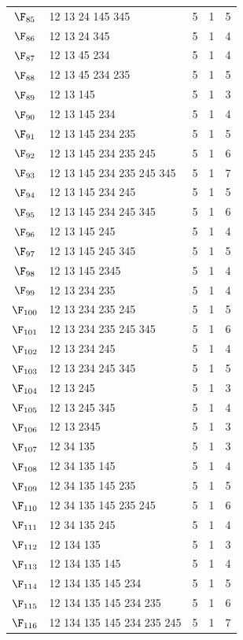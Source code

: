 {\begin{longtable}{c p{7cm} c c c}
$\F_{85}$ & 12 13 24 145 345 & 5 & 1 & 5 \\
$\F_{86}$ & 12 13 24 345 & 5 & 1 & 4 \\
$\F_{87}$ & 12 13 45 234 & 5 & 1 & 4 \\
$\F_{88}$ & 12 13 45 234 235 & 5 & 1 & 5 \\
$\F_{89}$ & 12 13 145 & 5 & 1 & 3 \\
$\F_{90}$ & 12 13 145 234 & 5 & 1 & 4 \\
$\F_{91}$ & 12 13 145 234 235 & 5 & 1 & 5 \\
$\F_{92}$ & 12 13 145 234 235 245 & 5 & 1 & 6 \\
$\F_{93}$ & 12 13 145 234 235 245 345 & 5 & 1 & 7 \\
$\F_{94}$ & 12 13 145 234 245 & 5 & 1 & 5 \\
$\F_{95}$ & 12 13 145 234 245 345 & 5 & 1 & 6 \\
$\F_{96}$ & 12 13 145 245 & 5 & 1 & 4 \\
$\F_{97}$ & 12 13 145 245 345 & 5 & 1 & 5 \\
$\F_{98}$ & 12 13 145 2345 & 5 & 1 & 4 \\
$\F_{99}$ & 12 13 234 235 & 5 & 1 & 4 \\
$\F_{100}$ & 12 13 234 235 245 & 5 & 1 & 5 \\
$\F_{101}$ & 12 13 234 235 245 345 & 5 & 1 & 6 \\
$\F_{102}$ & 12 13 234 245 & 5 & 1 & 4 \\
$\F_{103}$ & 12 13 234 245 345 & 5 & 1 & 5 \\
$\F_{104}$ & 12 13 245 & 5 & 1 & 3 \\
$\F_{105}$ & 12 13 245 345 & 5 & 1 & 4 \\
$\F_{106}$ & 12 13 2345 & 5 & 1 & 3 \\
$\F_{107}$ & 12 34 135 & 5 & 1 & 3 \\
$\F_{108}$ & 12 34 135 145 & 5 & 1 & 4 \\
$\F_{109}$ & 12 34 135 145 235 & 5 & 1 & 5 \\
$\F_{110}$ & 12 34 135 145 235 245 & 5 & 1 & 6 \\
$\F_{111}$ & 12 34 135 245 & 5 & 1 & 4 \\
$\F_{112}$ & 12 134 135 & 5 & 1 & 3 \\
$\F_{113}$ & 12 134 135 145 & 5 & 1 & 4 \\
$\F_{114}$ & 12 134 135 145 234 & 5 & 1 & 5 \\
$\F_{115}$ & 12 134 135 145 234 235 & 5 & 1 & 6 \\
$\F_{116}$ & 12 134 135 145 234 235 245 & 5 & 1 & 7 \\

\end{longtable}}

